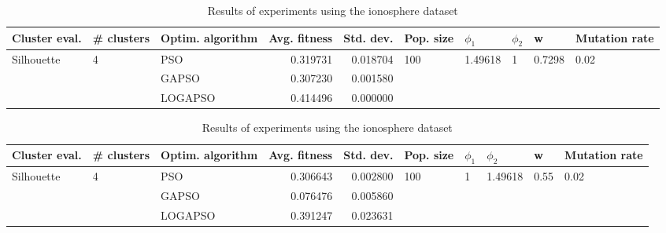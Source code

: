 \documentclass{article}
\begin{document}
\begin{table}
\centering
\caption{Results of experiments using the ionosphere dataset}
\begin{tabular}{lllrrlllll}
\toprule
              Cluster eval. &        \# clusters & Optim. algorithm &  Avg. fitness &  Std. dev. &            Pop. size &               $\phi_{1}$ &         $\phi_{2}$ &                       w &         Mutation rate \\
\midrule
\multirow{3}{*}{Silhouette} & \multirow{3}{*}{4} &              PSO &      0.319731 &   0.018704 & \multirow{3}{*}{100} & \multirow{3}{*}{1.49618} & \multirow{3}{*}{1} & \multirow{3}{*}{0.7298} & \multirow{3}{*}{0.02} \\
                            &                    &            GAPSO &      0.307230 &   0.001580 &                      &                          &                    &                         &                       \\
                            &                    &          LOGAPSO &      0.414496 &   0.000000 &                      &                          &                    &                         &                       \\
\bottomrule
\end{tabular}
\end{table}
\begin{table}
\centering
\caption{Results of experiments using the ionosphere dataset}
\begin{tabular}{lllrrlllll}
\toprule
              Cluster eval. &        \# clusters & Optim. algorithm &  Avg. fitness &  Std. dev. &            Pop. size &         $\phi_{1}$ &               $\phi_{2}$ &                     w &         Mutation rate \\
\midrule
\multirow{3}{*}{Silhouette} & \multirow{3}{*}{4} &              PSO &      0.306643 &   0.002800 & \multirow{3}{*}{100} & \multirow{3}{*}{1} & \multirow{3}{*}{1.49618} & \multirow{3}{*}{0.55} & \multirow{3}{*}{0.02} \\
                            &                    &            GAPSO &      0.076476 &   0.005860 &                      &                    &                          &                       &                       \\
                            &                    &          LOGAPSO &      0.391247 &   0.023631 &                      &                    &                          &                       &                       \\
\bottomrule
\end{tabular}
\end{table}
\end{document}
